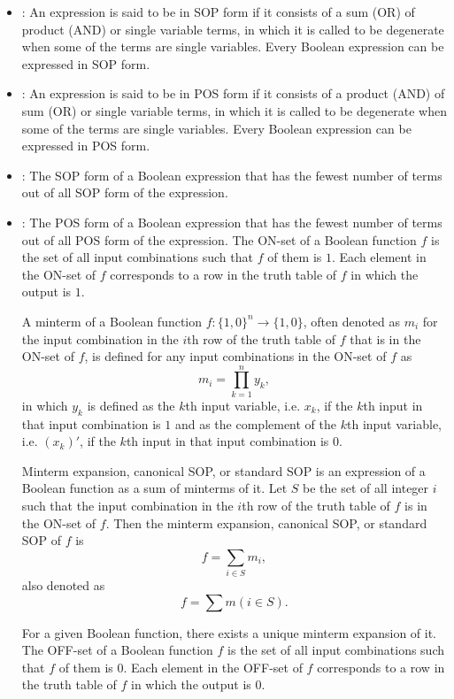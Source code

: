 \documentclass[a4paper,12pt]{report}
\begin{document}
\begin{itemize}
\begin{itemize}
\begin{itemize}
\begin{itemize}
\begin{itemize}
\begin{itemize}
\begin{itemize}
\begin{itemize}
\bit
\item{}: An expression is said to be in SOP form if it consists of a sum (OR) of product (AND) or single variable terms, in which it is called to be degenerate when some of the terms are single variables. Every Boolean expression can be expressed in SOP form.
\item{}: An expression is said to be in POS form if it consists of a product (AND) of sum (OR) or single variable terms, in which it is called to be degenerate when some of the terms are single variables. Every Boolean expression can be expressed in POS form.
\item{}: The SOP form of a Boolean expression that has the fewest number of terms out of all SOP form of the expression.
\item{}: The POS form of a Boolean expression that has the fewest number of terms out of all POS form of the expression.
\eit
{}
The ON-set of a Boolean function $f$ is the set of all input combinations such that $f$ of them is $1$. Each element in the ON-set of $f$ corresponds to a row in the truth table of $f$ in which the output is $1$.

A minterm of a Boolean function $f\colon\{1,0\}^n\to\{1,0\}$, often denoted as $m_i$ for the input combination in the $i$th row of the truth table of $f$ that is in the ON-set of $f$, is defined for any input combinations in the ON-set of $f$ as
\[m_i=\prod_{k=1}^ny_k,\]
in which $y_k$ is defined as the $k$th input variable, i.e. $x_k$, if the $k$th input in that input combination is $1$ and as the complement of the $k$th input variable, i.e. $(x_k)'$, if the $k$th input in that input combination is $0$.

Minterm expansion, canonical SOP, or standard SOP is an expression of a Boolean function as a sum of minterms of it. Let $S$ be the set of all integer $i$ such that the input combination in the $i$th row of the truth table of $f$ is in the ON-set of $f$. Then the minterm expansion, canonical SOP, or standard SOP of $f$ is
\[f=\sum_{i\in S}m_i,\]
also denoted as
\[f=\sum m(i\in S).\]

For a given Boolean function, there exists a unique minterm expansion of it.
The OFF-set of a Boolean function $f$ is the set of all input combinations such that $f$ of them is $0$. Each element in the OFF-set of $f$ corresponds to a row in the truth table of $f$ in which the output is $0$.


\end{itemize}
\end{itemize}
\end{itemize}
\end{itemize}
\end{itemize}
\end{itemize}
\end{itemize}
\end{itemize}
\end{document}
